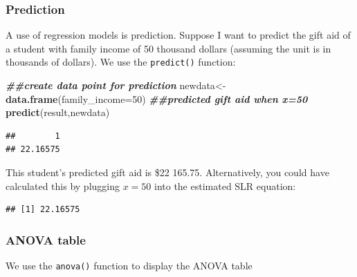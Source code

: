 \documentclass[
]{book}
\newenvironment{Shaded}{\begin{snugshade}}{\end{snugshade}}
\newcommand{\AttributeTok}[1]{\textcolor[rgb]{0.13,0.29,0.53}{#1}}
\newcommand{\DecValTok}[1]{\textcolor[rgb]{0.00,0.00,0.81}{#1}}
\newcommand{\DocumentationTok}[1]{\textcolor[rgb]{0.56,0.35,0.01}{\textbf{\textit{#1}}}}
\newcommand{\FunctionTok}[1]{\textcolor[rgb]{0.13,0.29,0.53}{\textbf{#1}}}
\newcommand{\NormalTok}[1]{#1}
\newcommand{\OtherTok}[1]{\textcolor[rgb]{0.56,0.35,0.01}{#1}}
\newcommand{\SpecialCharTok}[1]{\textcolor[rgb]{0.81,0.36,0.00}{\textbf{#1}}}
\begin{document}
\subsubsection*{Prediction}\label{prediction}

A use of regression models is prediction. Suppose I want to predict the gift aid of a student with family income of 50 thousand dollars (assuming the unit is in thousands of dollars). We use the \texttt{predict()} function:

\begin{Shaded}
\begin{Highlighting}[]
\DocumentationTok{\#\#create data point for prediction}
\NormalTok{newdata}\OtherTok{\textless{}{-}}\FunctionTok{data.frame}\NormalTok{(}\AttributeTok{family\_income=}\DecValTok{50}\NormalTok{)}
\DocumentationTok{\#\#predicted gift aid when x=50}
\FunctionTok{predict}\NormalTok{(result,newdata)}
\end{Highlighting}
\end{Shaded}

\begin{verbatim}
##        1 
## 22.16575
\end{verbatim}

This student's predicted gift aid is \$22 165.75. Alternatively, you could have calculated this by plugging \(x=50\) into the estimated SLR equation:

\begin{Shaded}
\end{Shaded}

\begin{verbatim}
## [1] 22.16575
\end{verbatim}

\subsubsection*{ANOVA table}\label{anova-table-1}

We use the \texttt{anova()} function to display the ANOVA table
\end{document}
